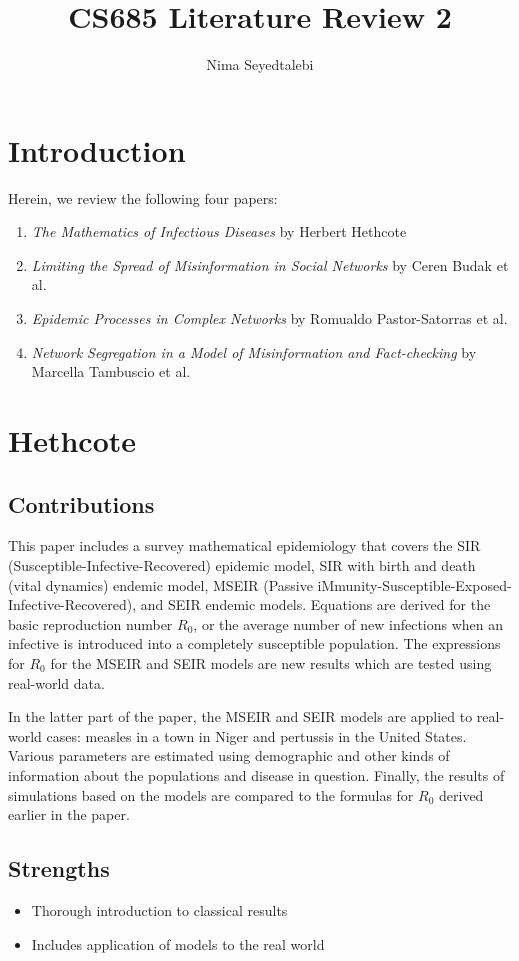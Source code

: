 \documentclass{article}
\author{Nima Seyedtalebi}
\title{CS685 Literature Review 2}
\begin{document}
\maketitle
\section{Introduction}
Herein, we review the following four papers:
\begin{enumerate}
    \item \textit{The Mathematics of Infectious Diseases} by Herbert Hethcote
    \item \textit{Limiting the Spread of Misinformation in Social Networks} by Ceren Budak et al.
    \item \textit{Epidemic Processes in Complex Networks} by Romualdo Pastor-Satorras et al.
    \item \textit{Network Segregation in a Model of Misinformation and Fact-checking} by Marcella Tambuscio et al.
\end{enumerate}

\section{Hethcote}
    \subsection{Contributions}
    This paper includes a survey mathematical epidemiology that covers the SIR (Susceptible-Infective-Recovered) epidemic model, SIR with birth and death (vital dynamics) endemic model, MSEIR (Passive iMmunity-Susceptible-Exposed-Infective-Recovered), and SEIR endemic models. Equations are derived for the basic reproduction number $R_{0}$, or the average number of new infections when an infective is introduced into a completely susceptible population. The expressions for $R_{0}$ for the MSEIR and SEIR models are new results which are tested using real-world data.
    
    In the latter part of the paper, the MSEIR and SEIR models are applied to real-world cases: measles in a town in Niger and pertussis in the United States. Various parameters are estimated using demographic and other kinds of information about the populations and disease in question. Finally, the results of simulations based on the models are compared to the formulas for $R_{0}$ derived earlier in the paper.
    
    \subsection{Strengths}
    \begin{itemize}
        \item Thorough introduction to classical results
        \item Includes application of models to the real world
    \end{itemize}
    
\end{document}
